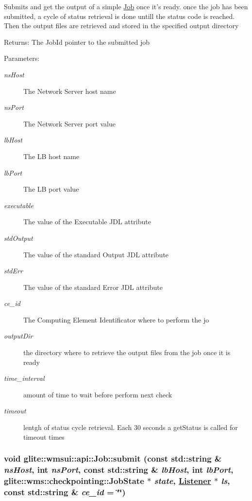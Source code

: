 Submits and get the output of a simple \hyperlink{classglite_1_1wmsui_1_1api_1_1Job}{Job} once it's ready. once the job has been submitted, a cycle of status retrieval is done untill the status code is reached. Then the output files are retrieved and stored in the specified output directory \begin{Desc}
\item[Returns:]The Job\-Id pointer to the submitted job \end{Desc}
\begin{Desc}
\item[Parameters:]
\begin{description}
\item[{\em ns\-Host}]The Network Server host name \item[{\em ns\-Port}]The Network Server port value \item[{\em lb\-Host}]The LB host name \item[{\em lb\-Port}]The LB port value \item[{\em executable}]The value of the Executable JDL attribute \item[{\em std\-Output}]The value of the standard Output JDL attribute \item[{\em std\-Err}]The value of the standard Error JDL attribute \item[{\em ce\_\-id}]The Computing Element Identificator where to perform the jo \item[{\em output\-Dir}]the directory where to retrieve the output files from the job once it is ready \item[{\em time\_\-interval}]amount of time to wait before perform next check \item[{\em timeout}]lentgh of status cycle retrieval. Each 30 seconds a get\-Status is called for timeout times \end{description}
\end{Desc}
\hypertarget{classglite_1_1wmsui_1_1api_1_1Job_z23_1}{
\subsubsection[submit]{\setlength{\rightskip}{0pt plus 5cm}void glite::wmsui::api::Job::submit (const std::string \& {\em ns\-Host}, int {\em ns\-Port}, const std::string \& {\em lb\-Host}, int {\em lb\-Port}, glite::wms::checkpointing::Job\-State $\ast$ {\em state}, \hyperlink{classglite_1_1wmsui_1_1api_1_1Listener}{Listener} $\ast$ {\em ls}, const std::string \& {\em ce\_\-id} = \char`\"{}\char`\"{})}}
\label{classglite_1_1wmsui_1_1api_1_1Job_z23_1}


